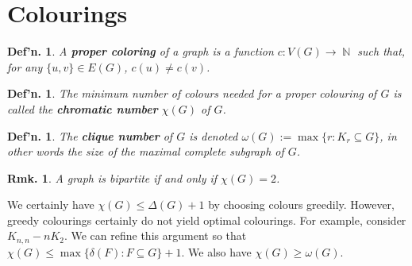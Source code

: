 \documentclass[12pt, a4paper]{book}
\DeclareMathOperator{\N}{\mathbb{N}}
\newtheorem{definition}[theorem]{Def'n.}
\newtheorem{remark}[theorem]{Rmk.}
\theoremstyle{nonumberplain}
\begin{document}
\section{Colourings}
\begin{definition}
    A \textbf{proper coloring} of a graph is a function $c:V(G)\to\N$ such that, for any $\{u,v\}\in E(G)$, $c(u)\neq c(v)$.
\end{definition}
\begin{definition}
    The minimum number of colours needed for a proper colouring of $G$ is called the \textbf{chromatic number} $\chi(G)$ of $G$.
\end{definition}
\begin{definition}
    The \textbf{clique number} of $G$ is denoted $\omega(G):=\max\{r:K_r\subseteq G\}$, in other words the size of the maximal complete subgraph of $G$.
\end{definition}
\begin{remark}
    A graph is bipartite if and only if $\chi(G)=2$.
\end{remark}
We certainly have $\chi(G)\leq\Delta(G)+1$ by choosing colours greedily.
However, greedy colourings certainly do not yield optimal colourings.
For example, consider $K_{n,n}-nK_2$.
We can refine this argument so that $\chi(G)\leq\max\{\delta(F):F\subseteq G\}+1$.
We also have $\chi(G)\geq\omega(G)$.
\end{document}
